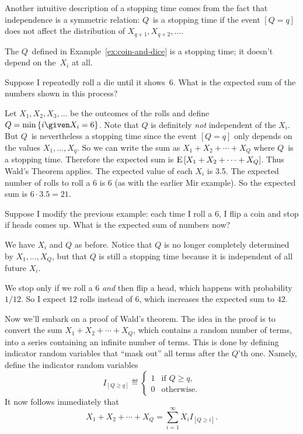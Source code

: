 \documentclass[11pt,twoside]{article}
\begin{document}
Another intuitive description of a stopping time comes from the fact
that independence is a symmetric relation: $Q$~is a stopping time if
the event $[Q = q]$ does not affect the distribution of $X_{q+1},
X_{q+2}, \dots$.
\begin{example}
  The $Q$~defined in Example~\ref{ex:coin-and-dice} is a stopping
  time; it doesn't depend on the~$X_i$ at all.
\end{example}
\begin{example}
  \label{ex:wald-dice}
  Suppose I repeatedly roll a die until it shows~6. What is the
  expected sum of the numbers shown in this process?

  Let $X_1, X_2, X_3, \dots$ be the outcomes of the rolls and define
  $Q = \min\set{i \given X_i = 6}$.  Note that $Q$ is definitely
  \emph{not} independent of the $X_i$.  But $Q$~is nevertheless a
  stopping time since the event $[Q = q]$ only depends on the values
  $X_1, \ldots, X_q$.  So we can write the sum as $X_1 + X_2 + \cdots
  + X_Q$ where $Q$~is a stopping time.  Therefore the expected sum is
  $\mathop{\textup{E}}\nolimits\left[X_1 + X_2 + \cdots + X_Q\right]$.  Thus Wald's Theorem applies.
  The expected value of each $X_i$ is 3.5.  The expected number of
  rolls to roll a 6 is 6 (as with the earlier Mir example).  So the
  expected sum is $6\cdot 3.5=21$.
\end{example}

\begin{example}
  Suppose I modify the previous example: each time I roll a 6, I flip
  a coin and stop if heads comes up.  What is the expected sum of
  numbers now?
  
  We have $X_i$ and $Q$ as before.  Notice that $Q$ is no longer
  completely determined by $X_1,\ldots,X_Q$, but that $Q$ is still a
  stopping time because it is independent of all future $X_i$.
  
  We stop only if we roll a 6 \emph{and} then flip a head, which
  happens with probability $1/12$.  So I expect 12 rolls instead of 6,
  which increases the expected sum to $42$.
\end{example}

Now we'll embark on a proof of Wald's theorem.  The idea in the proof is
to convert the sum $X_1 + X_2 + \cdots + X_Q$, which contains a random
number of terms, into a series containing an infinite number of terms.
This is done by defining indicator random variables that ``mask out'' all
terms after the $Q$'th one.  Namely, define the indicator random variables
\[
I_{[Q \geq q]} \eqdef \begin{cases}
  1 & \mbox{if $Q \geq q$,} \\
  0 & \mbox{otherwise.}
\end{cases}
\]
It now follows immediately that
\begin{equation}\label{lem:wald-indicators}
    X_1 + X_2 + \cdots + X_Q = \sum_{i=1}^{\infty} X_i I_{[Q \geq i]}.
\end{equation}
\end{document}
